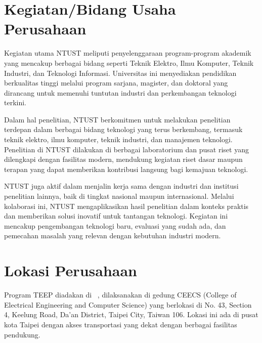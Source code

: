 \section{Kegiatan/Bidang Usaha Perusahaan}

Kegiatan utama NTUST meliputi penyelenggaraan program-program akademik yang mencakup berbagai bidang seperti Teknik Elektro, Ilmu Komputer, Teknik Industri, dan Teknologi Informasi. Universitas ini menyediakan pendidikan berkualitas tinggi melalui program sarjana, magister, dan doktoral yang dirancang untuk memenuhi tuntutan industri dan perkembangan teknologi terkini.

Dalam hal penelitian, NTUST berkomitmen untuk melakukan penelitian terdepan dalam berbagai bidang teknologi yang terus berkembang, termasuk teknik elektro, ilmu komputer, teknik industri, dan manajemen teknologi. Penelitian di NTUST dilakukan di berbagai laboratorium dan pusat riset yang dilengkapi dengan fasilitas modern, mendukung kegiatan riset dasar maupun terapan yang dapat memberikan kontribusi langsung bagi kemajuan teknologi.

NTUST juga aktif dalam menjalin kerja sama dengan industri dan institusi penelitian lainnya, baik di tingkat nasional maupun internasional. Melalui kolaborasi ini, NTUST mengaplikasikan hasil penelitian dalam konteks praktis dan memberikan solusi inovatif untuk tantangan teknologi. Kegiatan ini mencakup pengembangan teknologi baru, evaluasi yang sudah ada, dan pemecahan masalah yang relevan dengan kebutuhan industri modern.

\section{Lokasi Perusahaan}

Program TEEP diadakan di \namaUniv \ , dilaksanakan di gedung CEECS (College of Electrical Engineering and Computer Science) yang berlokasi di No. 43, Section 4, Keelung Road, Da'an District, Taipei City, Taiwan 106. Lokasi ini ada di pusat kota Taipei dengan akses transportasi yang dekat dengan berbagai fasilitas pendukung.


